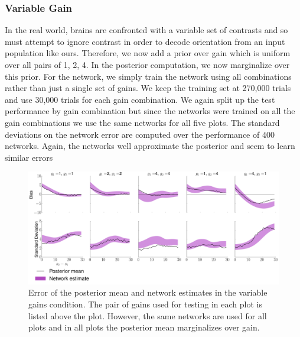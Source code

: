 \documentclass{article} %
\begin{document}
\subsubsection{Variable Gain}
In the real world, brains are confronted with a variable set of contrasts and so must attempt to ignore contrast in order to decode orientation from an input population like ours. Therefore, we now add a prior over gain which is uniform over all pairs of {1, 2, 4}. In the posterior computation, we now marginalize over this prior. For the network, we simply train the network using all combinations rather than just a single set of gains. We keep the training set at 270,000 trials and use 30,000 trials for each gain combination. We again split up the test performance by gain combination but since the networks were trained on all the gain combinations we use the same networks for all five plots. The standard deviations on the network error are computed over the performance of 400 networks. Again, the networks well approximate the posterior and seem to learn similar errors
\begin{figure}[h]
\centering
\includegraphics[width = \textwidth]{Variable_Gains.png}
\caption{Error of the posterior mean and network estimates in the variable gains condition. The pair of gains used for testing in each plot is listed above the plot. However, the same networks are used for all plots and in all plots the posterior mean marginalizes over gain.}
\end{figure}
\\
\\
\end{document}
